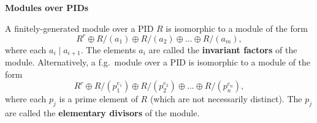 \noindent\textbf{Modules over PIDs}
\begin{thm}
A finitely-generated module over a PID $R$ is isomorphic to a module of the form
\[R^r \oplus R/(a_1) \oplus R/(a_2) \oplus \dots \oplus R/(a_m),\]
where each $a_i \mid a_{i+1}$. The elements $a_i$ are called the \textbf{invariant factors} of the module. Alternatively, a f.g.\ module over a PID is isomorphic to a module of the form
\[R^r \oplus R/(p_1^{e_1}) \oplus R/(p_2^{e_2}) \oplus \dots \oplus R/(p_n^{e_n}),\]
where each $p_j$ is a prime element of $R$ (which are not necessarily distinct). The $p_j$ are called the \textbf{elementary divisors} of the module.
\end{thm}